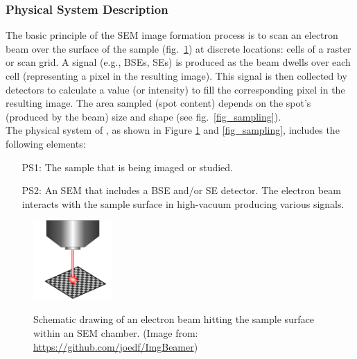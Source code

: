 \documentclass[12pt]{article}
\begin{document}
\subsubsection{Physical System Description} \label{sec_phySystDescrip}

The basic principle of the SEM image formation process is to scan an electron beam over the surface 
of the sample (fig.~\ref{fig_ebeam}) at discrete locations: cells of a raster or scan grid. A signal (e.g., BSEs, SEs) is 
produced as the beam dwells over each cell (representing a pixel in the resulting image). This 
signal is then collected by detectors to calculate a value (or intensity) to fill the corresponding
pixel in the resulting image. The area sampled (spot content) depends on the spot's (produced by the beam) size and 
shape (see fig.~\ref{fig_sampling}). \\

The physical system of \progname{}, as shown in Figure \ref{fig_ebeam} and \ref{fig_sampling},
includes the following elements:

\begin{itemize}

\item[PS1:] The sample that is being imaged or studied.

\item[PS2:] An SEM that includes a BSE and/or SE detector. The electron beam interacts with the sample surface in high-vacuum producing various signals.

\end{itemize}

\setlength{\belowcaptionskip}{-30pt}
\begin{figure}[h!]
\begin{center}
{
 \includegraphics[width=0.27\textwidth]{figures/e_beam.png}
}
\caption{\label{fig_ebeam} Schematic drawing of an electron beam hitting the sample surface within an SEM chamber. (Image from: \url{https://github.com/joedf/ImgBeamer})}
\end{center}
\end{figure}
\setlength{\belowcaptionskip}{10pt}
\end{document}
